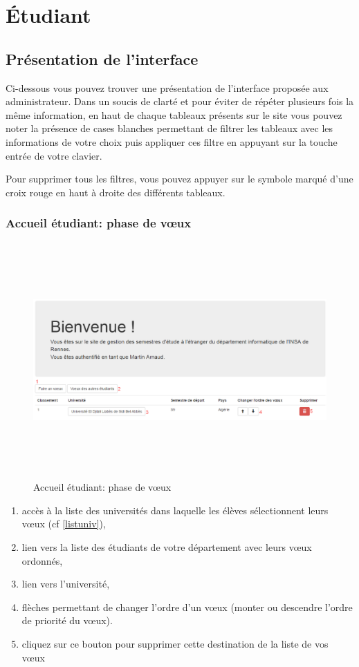 \chapter{Étudiant}

\section{Présentation de l'interface}
Ci-dessous vous pouvez trouver une présentation de l'interface proposée aux administrateur. Dans un soucis de clarté et pour éviter de répéter plusieurs fois la même information, en haut de chaque tableaux présents sur le site vous pouvez noter la présence de cases blanches permettant de filtrer les tableaux avec les informations de votre choix puis appliquer ces filtre en appuyant sur la touche entrée de votre clavier.

Pour supprimer tous les filtres, vous pouvez appuyer sur le symbole marqué d'une croix rouge en haut à droite des différents tableaux.

  \subsection{Accueil étudiant: phase de vœux}
   	\label{pv}
   	\begin{figure}[H]
  	\centering
  	
  	\includegraphics[width=16cm,height=9cm]{Images/Etudiant/faire_voeux_etud.png}
  	\caption{Accueil étudiant: phase de vœux}
  \end{figure}
            
    \begin{enumerate}
       	\item accès à la liste des universités dans laquelle les élèves sélectionnent leurs vœux (cf \ref{listuniv}),
       	\item lien vers la liste des étudiants de votre département avec leurs vœux ordonnés,
       	\item lien vers l'université,
       	\item flèches permettant de changer l'ordre d'un vœux (monter ou descendre l'ordre de priorité du vœux).
       	\item cliquez sur ce bouton pour supprimer cette destination de la liste de vos vœux 
     \end{enumerate}
     
